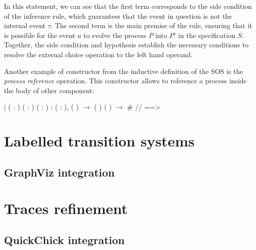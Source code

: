 In this statement, we can see that the first term corresponds to the side condition of the inference rule, which guarantees that the event in question is not the internal event $ \tau $. The second term is the main premise of the rule, ensuring that it is possible for the event $ a $ to evolve the process $ P $ into $ P' $ in the specification $ S $. Together, the side condition and hypothesis establish the necessary conditions to resolve the external choice operation to the left hand operand.

Another example of constructor from the inductive definition of the SOS is the \emph{process reference} operation. This constructor allows to reference a process inside the body of other component:

\begin{coqdoccode}
	\coqdocnoindent
	\ensuremath{|}  ( : ) ( : ) ( : ) :\coqdoceol
	\coqdocindent{1.00em}
	\coqdockw{\ensuremath{\forall}} ( : ),\coqdoceol
	\coqdocindent{3.00em}
	  ( ) \ensuremath{\rightarrow}\coqdoceol
	\coqdocindent{3.00em}
	 (  ) ( ) \ensuremath{\rightarrow}\coqdoceol
	\coqdocindent{3.00em}
	 \#  //  ==> \coqdoceol
\end{coqdoccode}

\section{Labelled transition systems}
\label{section:lts}

\subsection{GraphViz integration}

\section{Traces refinement}
\label{section:traces}

\subsection{QuickChick integration}
